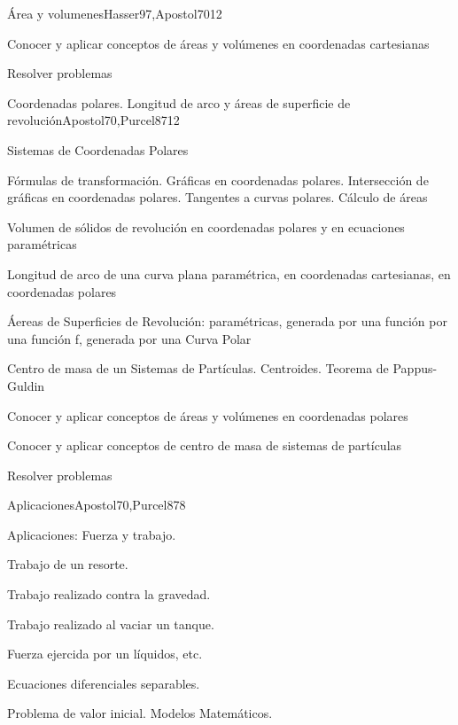 \begin{syllabus}
\begin{unit}{Área y volumenes}{Hasser97,Apostol70}{12}
\begin{unitgoals}
	\item Conocer y aplicar conceptos de áreas y volúmenes en coordenadas cartesianas
	\item Resolver problemas
\end{unitgoals}
\end{unit}

\begin{unit}{Coordenadas polares. Longitud de arco y áreas de superficie de revolución}{Apostol70,Purcel87}{12}
\begin{topics}
	\item Sistemas de Coordenadas Polares
	\item Fórmulas de transformación. Gráficas en coordenadas polares. Intersección de gráficas en coordenadas polares. Tangentes a curvas polares. Cálculo de áreas
	\item Volumen de sólidos de revolución en coordenadas polares y en ecuaciones paramétricas
	\item Longitud de arco de una curva plana paramétrica, en coordenadas cartesianas, en  coordenadas polares
	\item Áereas de Superficies de Revolución: paramétricas,  generada por una función por una  función f, generada por una Curva  Polar
	\item Centro de masa de un Sistemas de Partículas. Centroides. Teorema de Pappus-Guldin
\end{topics}

\begin{unitgoals}
	\item Conocer y aplicar conceptos de áreas y volúmenes en coordenadas polares
	\item Conocer y aplicar conceptos de centro de masa de sistemas de partículas
	\item Resolver problemas
\end{unitgoals}
\end{unit}

\begin{unit}{Aplicaciones}{Apostol70,Purcel87}{8}
\begin{topics}
      \item Aplicaciones: Fuerza y trabajo. 
      \item Trabajo de un resorte. 
      \item Trabajo realizado contra la gravedad. 
      \item Trabajo realizado al vaciar un tanque. 
      \item Fuerza ejercida por un líquidos, etc.
      \item Ecuaciones diferenciales separables. 
      \item Problema de valor inicial. Modelos Matemáticos.
\end{topics}


\end{unit}
\end{syllabus}
